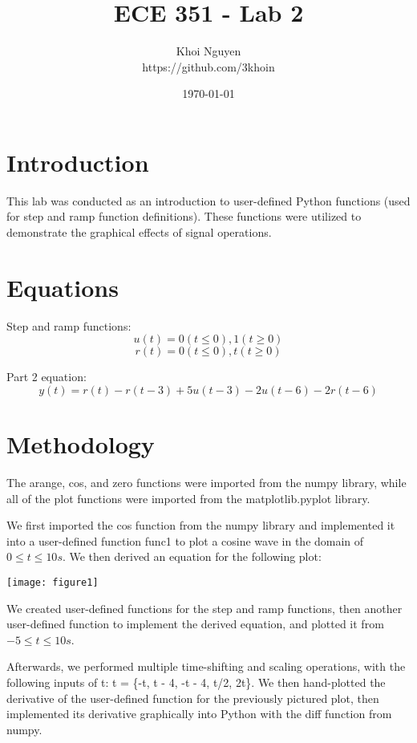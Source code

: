 \documentclass[11pt,a4]{article}
\title{ECE 351 - Lab 2}
\author{Khoi Nguyen \\ https://github.com/3khoin}
\date{\today}
\begin{document}
\maketitle
\pagebreak

\tableofcontents
\pagebreak

\section{Introduction}
This lab was conducted as an introduction to user-defined Python functions (used for step and ramp function definitions). These functions were utilized to demonstrate the graphical effects of signal operations.

\section{Equations}
Step and ramp functions:
\[u(t) = {0(t \leq 0)}, 1(t \geq 0)\] 
\[r(t) = {0(t \leq 0)}, t(t \geq 0)\] 

Part 2 equation:
\[y(t) = r(t) - r(t-3) + 5u(t-3) - 2u(t-6) - 2r(t-6)\]

\section{Methodology}
The arange, cos, and zero functions were imported from the numpy library, while all of the plot functions were imported from the matplotlib.pyplot library.

We first imported the cos function from the numpy library and implemented it into a user-defined function func1 to plot a cosine wave in the domain of $0\leq t \leq 10s$. We then derived an equation for the following plot:

\begin{center}
	\texttt{[image: figure1]}
\end{center}

We created user-defined functions for the step and ramp functions, then another user-defined function to implement the derived equation, and plotted it from $-5\leq t \leq 10s$.

Afterwards, we performed multiple time-shifting and scaling operations, with the following inputs of t: t = \{-t, t - 4, -t - 4, t/2, 2t\}. We then hand-plotted the derivative of the user-defined function for the previously pictured plot, then implemented its derivative graphically into Python with the diff function from numpy.
\end{document}

